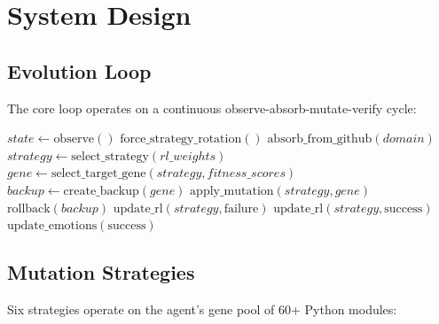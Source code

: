 \documentclass[11pt,a4paper]{article}
\begin{document}
\section{System Design}

\subsection{Evolution Loop}

The core loop operates on a continuous observe-absorb-mutate-verify cycle:

\begin{algorithm}[H]
\caption{MUE-X Evolution Loop}
\begin{algorithmic}[1]
    \State $state \gets \text{observe}()$ 
        \State $\text{force\_strategy\_rotation}()$
    \EndIf
        \State $\text{absorb\_from\_github}(domain)$ 
    \EndIf
    \State $strategy \gets \text{select\_strategy}(rl\_weights)$
    \State $gene \gets \text{select\_target\_gene}(strategy, fitness\_scores)$
    \State $backup \gets \text{create\_backup}(gene)$
    \State $\text{apply\_mutation}(strategy, gene)$
        \State $\text{rollback}(backup)$
        \State $\text{update\_rl}(strategy, \text{failure})$
    \Else
        \State $\text{update\_rl}(strategy, \text{success})$
        \State $\text{update\_emotions}(\text{success})$
    \EndIf
\EndWhile
\end{algorithmic}
\end{algorithm}

\subsection{Mutation Strategies}

Six strategies operate on the agent's gene pool of 60+ Python modules:
\end{document}
